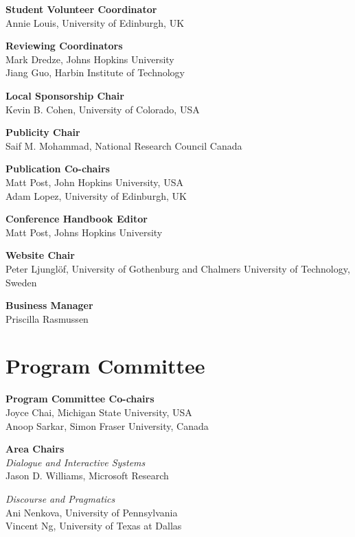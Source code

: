 {\bf Student Volunteer Coordinator} \\
Annie Louis, University of Edinburgh, UK

{\bf Reviewing Coordinators} \\
Mark Dredze, Johns Hopkins University \\
Jiang Guo, Harbin Institute of Technology

{\bf Local Sponsorship Chair} \\
Kevin B. Cohen, University of Colorado, USA

{\bf Publicity Chair} \\
Saif M. Mohammad, National Research Council Canada

{\bf Publication Co-chairs} \\
Matt Post, John Hopkins University, USA \\
Adam Lopez, University of Edinburgh, UK

{\bf Conference Handbook Editor} \\
Matt Post, Johns Hopkins University

{\bf Website Chair} \\
Peter Ljunglöf, University of Gothenburg and Chalmers University of Technology, Sweden

{\bf Business Manager} \\
Priscilla Rasmussen


\clearpage
\section{Program Committee}
\setlength{\parindent}{0pt}

\vspace*{0.5cm}

{\bf Program Committee Co-chairs} \\
Joyce Chai, Michigan State University, USA \\
Anoop Sarkar, Simon Fraser University, Canada

{\bf Area Chairs} \\
\emph{Dialogue and Interactive Systems} \\
\hspace*{0.2in} Jason D. Williams, Microsoft Research

\emph{Discourse and Pragmatics} \\
\hspace*{0.2in} Ani Nenkova, University of Pennsylvania \\
\hspace*{0.2in} Vincent Ng, University of Texas at Dallas 

